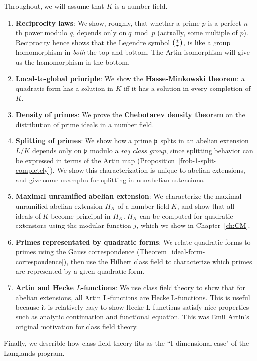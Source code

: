 Throughout, we will assume that $K$ is a number field.
\begin{enumerate}
\item \textbf{Reciprocity laws}: We show, roughly, that whether a prime $p$ is a perfect $n$th power modulo $q$, depends {only} on $q\bmod p$ (actually, some multiple of $p$). Reciprocity hence shows that the Legendre symbol $\left( {\frac{*}{\bullet}} \right)$, is like a group homomorphism in {\it both} the top and bottom. The Artin isomorphism will give us the homomorphism in the bottom.
\item \textbf{Local-to-global principle}: We show the \textbf{Hasse-Minkowski theorem}: a quadratic form has a solution in $K$ iff it has a solution in every completion of $K$.
\item \textbf{Density of primes}: We prove the \textbf{Chebotarev density theorem} on the distribution of prime ideals in a number field.
\item \textbf{Splitting of primes}: We show how a prime $\mathfrak{p}$ splits in an abelian extension $L/K$ depends only on $\mathfrak{p}$ modulo a {\it ray class group}, since splitting behavior can be expressed in terms of the Artin map (Proposition~\ref{frob-1-split-completely}). We show this characterization is unique to abelian extensions, and give some examples for splitting in nonabelian extensions.
\item \textbf{Maximal unramified abelian extension}: We characterize the maximal unramified abelian extension $H_K$ of a number field $K$, and show that all ideals of $K$ become principal in $H_K$. $H_K$ can be computed for quadratic extensions using the modular function $j$, which we show in Chapter~\ref{ch:CM}.
\item \textbf{Primes representated by quadratic forms}: We relate quadratic forms to primes using the Gauss correspondence (Theorem~\ref{ideal-form-correspondence}), then use the Hilbert class field to characterize which primes are represented by a given quadratic form.
\item \textbf{Artin and Hecke $L$-functions}: We use class field theory to show that for abelian extensions, all Artin L-functions are Hecke L-functions. This is useful because it is relatively easy to show Hecke L-functions satisfy nice properties such as analytic continuation and functional equation. 
This was Emil Artin's original motivation for class field theory.
\end{enumerate}
Finally, we describle how class field theory fits as the ``1-dimensional case" of the Langlands program.
